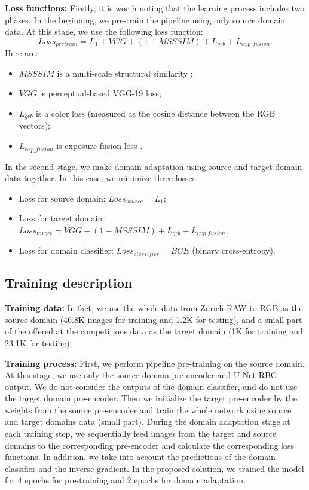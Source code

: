 \documentclass{article}
\begin{document}
\textbf{Loss functions:} Firstly, it is worth noting that the learning process includes two phases. In the beginning, we pre-train the pipeline using only source domain data. At this stage, we use the following loss function: 
$$
Loss_{pretrain} = L_1 + VGG + (1 - MSSSIM) + L_{grb} + L_{exp\_fusion}.
$$
Here are:
\begin{itemize}
\item $MSSSIM$ is a multi-scale structural similarity \cite{wang2003multiscale};
\item $VGG$ is perceptual-based VGG-19 loss;
\item $L_{grb}$ is a color loss (measured as the cosine distance between the RGB vectors);
\item $L_{exp\_fusion}$ is exposure fusion loss \cite{mertens2009exposure}.
\end{itemize}
In the second stage, we make domain adaptation using   source and target domain data together. In this case, we minimize three losses: 
\begin{itemize}
\item Loss for source domain: $Loss_{source}=L_1$;
\item Loss for target domain: $Loss_{target}=VGG + (1 - MSSSIM) + L_{grb} + L_{exp\_fusion}$;
\item Loss for domain classifier: $Loss_{classifier}=BCE$ (binary cross-entropy).
\end{itemize}
\smallskip

\subsection{Training description}

\textbf{Training data:} In fact, we use the whole data from Zurich-RAW-to-RGB \cite{ignatov2020replacing} as the source domain (46.8K images for training and 1.2K for testing), and a small part of the offered at the competitions data as the target domain (1K for training and 23.1K for testing).

\textbf{Training process:} First, we perform pipeline pre-training on the source domain. At this stage, we use only the source domain pre-encoder and U-Net RBG output. We do not consider the outputs of the domain classifier, and do not use the target domain pre-encoder. Then we initialize the target pre-encoder by the weights from the source pre-encoder and train the whole network using source and target domains data (small part). During the domain adaptation stage at each training step, we sequentially feed images from the target and source domains to the corresponding pre-encoder and calculate the corresponding loss functions. In addition, we take into account the predictions of the domain classifier and the inverse gradient. In the proposed solution, we trained the model for 4 epochs for pre-training and 2 epochs for domain adaptation.
\end{document}
